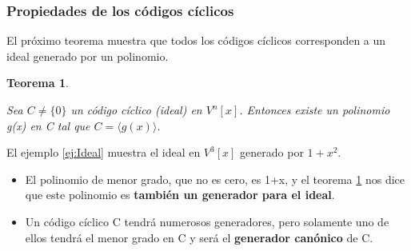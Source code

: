 \documentclass{beamer}
\theoremstyle{plain}
\newtheorem{teorema} [Teorema] {Teorema}
\theoremstyle{example}
\theoremstyle{example}
\begin{document}
\begin{frame}  \frametitle{Propiedades de los códigos cíclicos}\small  

El próximo teorema muestra que todos los códigos cíclicos corresponden a un ideal generado por un polinomio.

\begin{teorema}\label{te:ideal}

Sea $C \neq \{0\}$ un código cíclico (ideal) en $V^n[x]$. Entonces existe un polinomio g(x) en C tal que $C=\langle g(x)\rangle$.

\end{teorema}


El ejemplo \ref{ej:Ideal} muestra el ideal en $V^3[x]$ generado por $1+x^2$. 


\begin{itemize} 

\footnotesize

\item El polinomio de menor grado, que no es cero, es 1+x, y el teorema \ref{te:ideal} nos dice que este polinomio es \textbf{también un generador para el ideal}. 

\item Un código cíclico C tendrá numerosos generadores, pero solamente uno de ellos tendrá el menor grado en C y será el \textbf{generador canónico} de C.


\end{itemize} 


\end{frame} 
\end{document}
